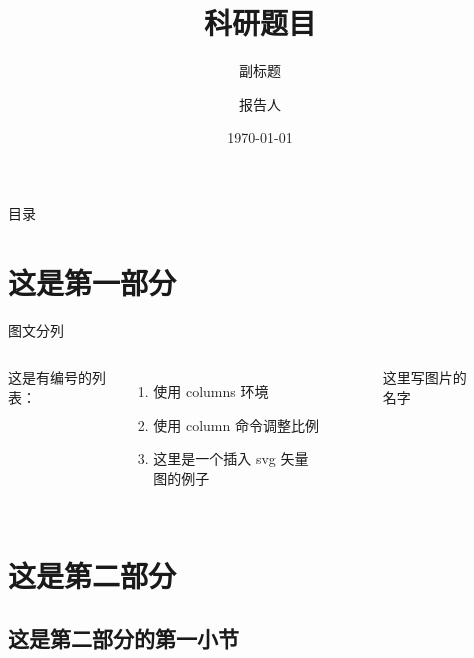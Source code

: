 \documentclass[aspectratio=169]{beamer}
\title{科研题目}
\subtitle{副标题} %
\author{报告人}
\institute{控制与计算机工程学院}
\date{\today}
\begin{document}
\begin{frame}[noframenumbering]

  \titlepage

\end{frame}

\begin{frame}{目录}

  \centering
  \begin{minipage}{0.8\textwidth}
    \tableofcontents
  \end{minipage}

\end{frame}


\section{这是第一部分}

\begin{frame}{图文分列}

  \begin{columns}

    这是有编号的列表：
    \begin{enumerate}
      \item 使用 columns 环境
      \item 使用 column 命令调整比例
      \item 这里是一个插入 svg 矢量图的例子
    \end{enumerate}


    \begin{figure}
      \centering
      
      \caption{这里写图片的名字}
    \end{figure}

  \end{columns}

\end{frame}

\section{这是第二部分}

\subsection{这是第二部分的第一小节}
\end{document}
